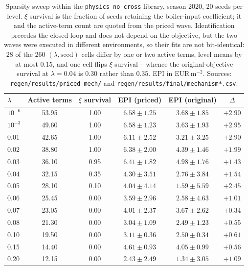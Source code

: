 \begin{table}[t]
\centering
\caption{Sparsity sweep within the \texttt{physics\_no\_cross} library, season 2020,
20 seeds per level. $\xi$ survival is the fraction
of seeds retaining the boiler-input coefficient; it and the active-term count are quoted
from the priced wave. Identification precedes the closed loop and does not depend on the
objective, but the two waves were executed in different environments, so their fits are not
bit-identical: 28 of the 260 $(\lambda,\text{seed})$ cells differ by one or two active
terms, level means by at most $0.15$, and one cell flips $\xi$ survival -- whence the
original-objective survival at $\lambda=0.04$ is $0.30$ rather than $0.35$. EPI in
EUR\,m$^{-2}$. Sources: \texttt{regen/results/priced\_mech/} and
\texttt{regen/results/final/mechanism*.csv}.}
\label{tab:lambda}
\small
\begin{tabular}{@{}lccccc@{}}
\toprule
$\lambda$ & Active terms & $\xi$ survival & EPI (priced) & EPI (original) & $\Delta$ \\
\midrule
$10^{-6}$ & 53.95 & 1.00 & $6.58\pm1.25$ & $3.68\pm1.85$ & $+2.90$ \\
$10^{-3}$ & 49.60 & 1.00 & $6.58\pm1.23$ & $3.63\pm1.93$ & $+2.95$ \\
0.01 & 42.65 & 1.00 & $6.11\pm2.52$ & $3.21\pm3.25$ & $+2.90$ \\
0.02 & 38.80 & 1.00 & $6.38\pm2.00$ & $4.39\pm1.46$ & $+1.99$ \\
0.03 & 36.10 & 0.95 & $6.41\pm1.82$ & $4.98\pm1.76$ & $+1.43$ \\
0.04 & 32.15 & 0.35 & $4.30\pm3.51$ & $2.76\pm3.84$ & $+1.54$ \\
0.05 & 28.10 & 0.10 & $4.04\pm4.14$ & $1.59\pm5.59$ & $+2.45$ \\
0.06 & 25.45 & 0.00 & $3.59\pm2.96$ & $2.58\pm4.63$ & $+1.01$ \\
0.07 & 23.05 & 0.00 & $4.01\pm2.37$ & $3.67\pm2.62$ & $+0.34$ \\
0.08 & 21.30 & 0.00 & $3.04\pm1.09$ & $2.49\pm1.23$ & $+0.55$ \\
0.10 & 19.50 & 0.00 & $3.11\pm0.36$ & $2.50\pm0.34$ & $+0.61$ \\
0.15 & 14.40 & 0.00 & $4.61\pm0.93$ & $4.05\pm0.99$ & $+0.56$ \\
0.20 & 12.15 & 0.00 & $2.43\pm2.49$ & $1.34\pm3.05$ & $+1.09$ \\
\bottomrule
\end{tabular}
\end{table}

